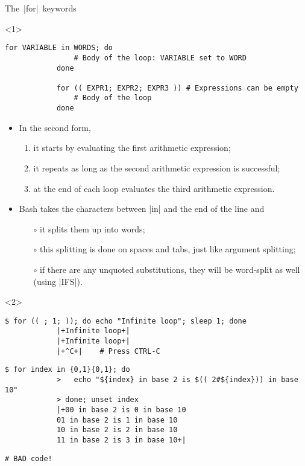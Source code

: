 \begin{frame}[fragile]{The \,\bash|for|\, keywords}
    \begin{onlyenv}<1>
        \begin{lstlisting}[style=MyBash, numbers=none]
            for VARIABLE in WORDS; do
                # Body of the loop: VARIABLE set to WORD
            done
            
            for (( EXPR1; EXPR2; EXPR3 )) # Expressions can be empty
                # Body of the loop
            done
        \end{lstlisting}
        \bigskip
        \begin{itemize}
            \item In the second form,
                  \begin{enumerate}
                      \item it starts by evaluating the first arithmetic expression;
                      \item it repeats as long as the second arithmetic expression is successful;
                      \item at the end of each loop evaluates the third arithmetic expression.
                  \end{enumerate}
            \item Bash takes the characters between \bash|in| and the end of the line and 
                  \begin{itemize}
                      \item[$\circ$] it splits them up into words;
                      \item[$\circ$] this splitting is done on spaces and tabs, just like argument splitting;
                      \item[$\circ$] if there are any unquoted substitutions, \alert{they will be word-split as well} (using \bash|IFS|).
                  \end{itemize}
        \end{itemize}
    \end{onlyenv}
    \begin{onlyenv}<2>
        \begin{lstlisting}[style=MyBash, xrightmargin=4mm]
            $ for (( ; 1; )); do echo "Infinite loop"; sleep 1; done
            |+Infinite loop+|
            |+Infinite loop+|
            |+^C+|    # Press CTRL-C
        \end{lstlisting}
        \medskip
        \begin{lstlisting}[style=MyBash, xrightmargin=4mm]
            $ for index in {0,1}{0,1}; do
            >   echo "${index} in base 2 is $(( 2#${index})) in base 10"
            > done; unset index
            |+00 in base 2 is 0 in base 10
            01 in base 2 is 1 in base 10
            10 in base 2 is 2 in base 10
            11 in base 2 is 3 in base 10+|
        \end{lstlisting}
        \medskip
        \begin{lstlisting}[style=MyBash, xrightmargin=4mm]
            # BAD code!
            

\end{lstlisting}
\end{onlyenv}
\end{frame}
